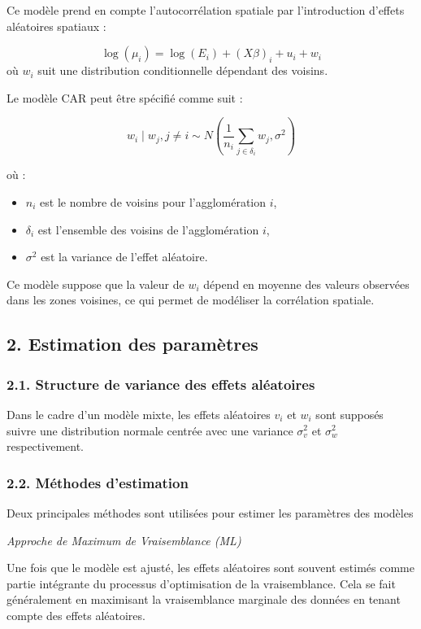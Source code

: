 \documentclass[
]{article}
\providecommand{\tightlist}{%
  \setlength{\itemsep}{0pt}\setlength{\parskip}{0pt}}
\begin{document}
Ce modèle prend en compte l'autocorrélation spatiale par l'introduction
d'effets aléatoires spatiaux :

\[
\log(\mu_i) = \log(E_i) + (X\beta)_i + u_i + w_i
\] où \(w_i\) suit une distribution conditionnelle dépendant des
voisins.

Le modèle CAR peut être spécifié comme suit :

\[
w_i \mid w_j, j \neq i \sim N \left( \frac{1}{n_i} \sum_{j \in \delta_i} w_j, \sigma^2 \right)
\]

où :

\begin{itemize}
\tightlist
\item
  \(n_i\) est le nombre de voisins pour l'agglomération \(i\),
\item
  \(\delta_i\) est l'ensemble des voisins de l'agglomération \(i\),
\item
  \(\sigma^2\) est la variance de l'effet aléatoire.
\end{itemize}

Ce modèle suppose que la valeur de \(w_i\) dépend en moyenne des valeurs
observées dans les zones voisines, ce qui permet de modéliser la
corrélation spatiale.

\subsection{2. Estimation des
paramètres}\label{estimation-des-paramuxe8tres}

\subsubsection{2.1. Structure de variance des effets
aléatoires}\label{structure-de-variance-des-effets-aluxe9atoires}

Dans le cadre d'un modèle mixte, les effets aléatoires \(v_i\) et
\(w_i\) sont supposés suivre une distribution normale centrée avec une
variance \(\sigma_v^2\) et \(\sigma_w^2\) respectivement.

\subsubsection{2.2. Méthodes
d'estimation}\label{muxe9thodes-destimation}

Deux principales méthodes sont utilisées pour estimer les paramètres des
modèles

\emph{Approche de Maximum de Vraisemblance (ML)}

Une fois que le modèle est ajusté, les effets aléatoires sont souvent
estimés comme partie intégrante du processus d'optimisation de la
vraisemblance. Cela se fait généralement en maximisant la vraisemblance
marginale des données en tenant compte des effets aléatoires.
\end{document}
